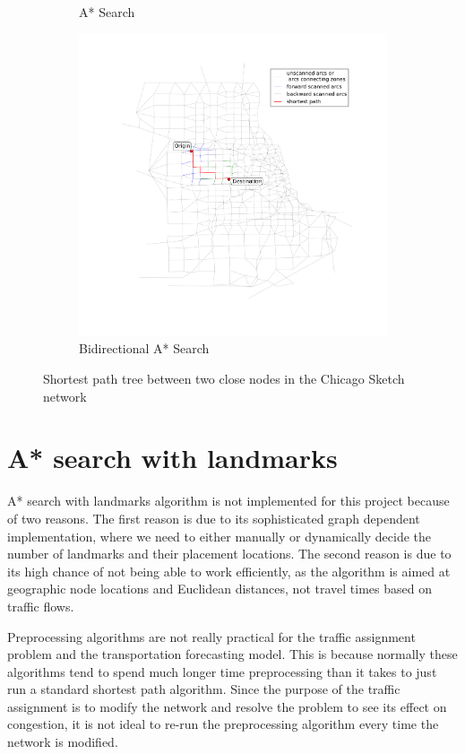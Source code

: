 \begin{figure}
\begin{subfigure}{.5\textwidth}
        \caption{A* Search}
        \label{fig:chicago_astar2}
    \end{subfigure}%
    \begin{subfigure}{.5\textwidth}
        \centering
        \includegraphics[width=\textwidth,trim=120px 120px 48px 0px,clip]{img/chicago_astar_bidirect2}
        \caption{Bidirectional A* Search}
        \label{fig:chicago_astar_bidirect2}
    \end{subfigure}
    \vspace{1em}
    \caption{Shortest path tree between two close nodes in the Chicago Sketch network}
    \label{fig:short_sptree}
\end{figure}

\section{A* search with landmarks}
A* search with landmarks algorithm is not implemented for this project because of two reasons.
The first reason is due to its sophisticated graph dependent implementation,
where we need to either manually or dynamically decide the number of landmarks and their placement locations.
The second reason is due to its high chance of not being able to work efficiently,
as the algorithm is aimed at geographic node locations and Euclidean distances,
not travel times based on traffic flows.

Preprocessing algorithms are not really practical for the traffic assignment problem and the transportation forecasting model.
This is because normally these algorithms tend to spend much longer time preprocessing than it takes to just run a standard shortest path algorithm.
Since the purpose of the traffic assignment is to modify the network and resolve the problem to see its effect on congestion,
it is not ideal to re-run the preprocessing algorithm every time the network is modified.

